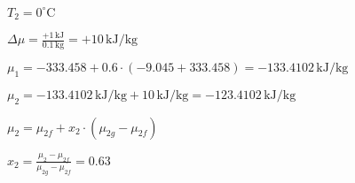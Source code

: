 \( T_2 = 0^\circ \text{C} \)  

\( \Delta \mu = \frac{+1 \, \text{kJ}}{0.1 \, \text{kg}} = +10 \, \text{kJ/kg} \)  

\( \mu_1 = -333.458 + 0.6 \cdot (-9.045 + 333.458) = -133.4102 \, \text{kJ/kg} \)  

\( \mu_2 = -133.4102 \, \text{kJ/kg} + 10 \, \text{kJ/kg} = -123.4102 \, \text{kJ/kg} \)  

\( \mu_2 = \mu_{2f} + x_2 \cdot (\mu_{2g} - \mu_{2f}) \)  

\( x_2 = \frac{\mu_2 - \mu_{2f}}{\mu_{2g} - \mu_{2f}} = 0.63 \)